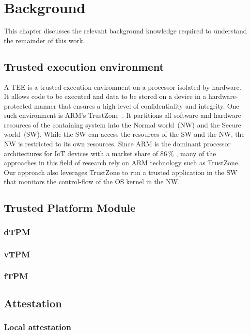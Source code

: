 \chapter{Background}\label{chapter:background}

This chapter discusses the relevant background knowledge required to understand the remainder of this work.

\section{Trusted execution environment}
A \ac{TEE} is a trusted execution environment on a processor isolated by hardware.
It allows code to be executed and data to be stored on a device in a hardware-protected manner that ensures a high level of confidentiality and integrity. One such environment is ARM's TrustZone~\cite{ARM09}. It partitions all software and hardware resources of the containing system into the Normal world~(NW) and the Secure world~(SW). While the SW can access the resources of the SW and the NW, the NW is restricted to its own resources.
Since ARM is the dominant processor architectures for IoT devices with a market share of 86\,\% \cite{eclipse}, many of the approaches in this field of research rely on ARM technology such as TrustZone. Our approach also leverages TrustZone to run a trusted application in the SW that monitors the control-flow of the OS kernel in the NW.



\section{Trusted Platform Module}
\subsection{dTPM}
\subsection{vTPM}
\subsection{fTPM}

\section{Attestation}
\subsection{Local attestation}
